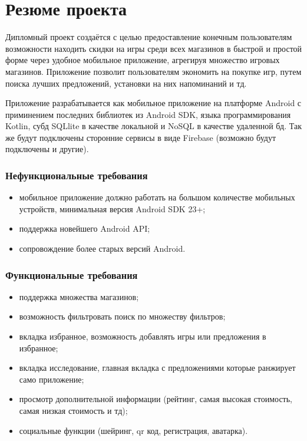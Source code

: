 \section{Резюме проекта}
\label{sec:ttt}
 
Дипломный проект создаётся с целью предоставление конечным пользователям возможности находить скидки на игры среди всех магазинов в быстрой и простой форме через удобное мобильное приложение, агрегируя множество игровых магазинов. Приложение позволит пользователям экономить на покупке игр, путем поиска лучших предложений, установки на них напоминаний и тд.

Приложение разрабатывается как мобильное приложение на платформе Android с приминением последних библиотек из Android SDK, языка программирования Kotlin, субд SQLlite в качестве локальной и NoSQL в качестве удаленной бд. Так же будут подключены сторонние сервисы в виде Firebase (возможно будут подключены и другие).

\subsubsection{Нефункциональные требования}
\begin{itemize}
 \item мобильное приложение должно работать на большом количестве мобильных устройств, минимальная версия Android SDK 23+;
 \item поддержка новейшего Android API;
 \item сопровождение более старых версий Android.
\end{itemize}
 
\subsubsection{Функциональные требования}
\begin{itemize}
  \item поддержка множества магазинов;
  \item возможность фильтровать поиск по множеству фильтров;
  \item вкладка избранное, возможность добавлять игры или предложения в избранное;
  \item вкладка исследование, главная вкладка с предложениями которые ранжирует само приложение;
  \item просмотр дополнительной информации (рейтинг, самая высокая стоимость, самая низкая стоимость и тд);
  \item социальные функции (шейринг, qr код, регистрация, аватарка).
\end{itemize}
 
